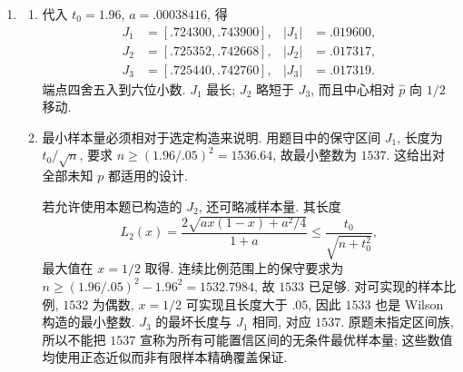 \begin{solution}
\begin{enumerate}[label=\arabic*.]
\[
\frac{\sqrt n(\bar X_n-p)}{\sqrt{\bar X_n(1-\bar X_n)}}\dto N(0,1).
\]
这个比值在 $\bar X_n=0,1$ 上可任意定义, 因为这些事件的总概率 $(1-p)^n+p^n\to0$. 取
$J_3=[\bar X_n-t_0\sqrt{\bar X_n(1-\bar X_n)/n},\bar X_n+t_0\sqrt{\bar X_n(1-\bar X_n)/n}]$;
除去上述概率趋零的事件, 覆盖事件正是学生化比值的绝对值不超过 $t_0$, 故覆盖率趋于 $.95$.
\item \begin{enumerate}[label=(\alph*)]
\item 代入 $t_0=1.96$, $a=.00038416$, 得
\begin{align*}
J_1&=[.724300,.743900],& |J_1|&=.019600,\\
J_2&=[.725352,.742668],& |J_2|&=.017317,\\
J_3&=[.725440,.742760],& |J_3|&=.017319.
\end{align*}
端点四舍五入到六位小数. $J_1$ 最长; $J_2$ 略短于 $J_3$, 而且中心相对 $\hat p$ 向 $1/2$ 移动.
\item 最小样本量必须相对于选定构造来说明. 用题目中的保守区间 $J_1$, 长度为 $t_0/\sqrt n$, 要求 $n\ge(1.96/.05)^2=1536.64$, 故最小整数为 $1537$. 这给出对全部未知 $p$ 都适用的设计.

若允许使用本题已构造的 $J_2$, 还可略减样本量. 其长度
\[
L_2(x)=\frac{2\sqrt{ax(1-x)+a^2/4}}{1+a}
\le\frac{t_0}{\sqrt{n+t_0^2}},
\]
最大值在 $x=1/2$ 取得. 连续比例范围上的保守要求为
$n\ge(1.96/.05)^2-1.96^2=1532.7984$, 故 $1533$ 已足够. 对可实现的样本比例, $1532$ 为偶数, $x=1/2$ 可实现且长度大于 $.05$, 因此 $1533$ 也是 Wilson 构造的最小整数. $J_3$ 的最坏长度与 $J_1$ 相同, 对应 $1537$. 原题未指定区间族, 所以不能把 $1537$ 宣称为所有可能置信区间的无条件最优样本量; 这些数值均使用正态近似而非有限样本精确覆盖保证.
\end{enumerate}
\end{enumerate}
\end{solution}
